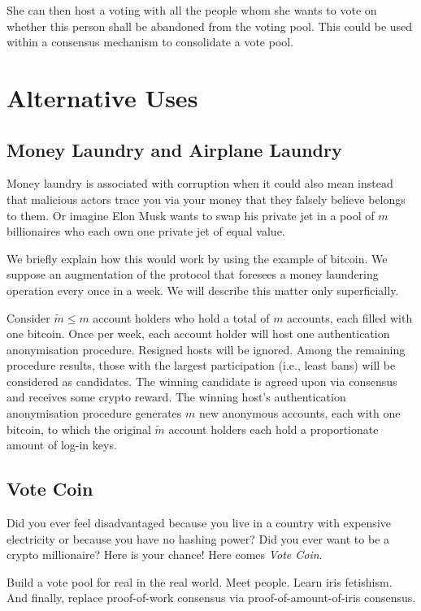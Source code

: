 \documentclass{article}
\theoremstyle{definition}
\begin{document}
	She can then host a voting with all the people whom she wants to vote on whether this person shall be abandoned from the voting pool. This could be used within a consensus mechanism to consolidate a vote pool.
	
	\section{Alternative Uses}
	
	\subsection{Money Laundry and Airplane Laundry}
	Money laundry is associated with corruption when it could also mean instead that malicious actors trace you via your money that they falsely believe belongs to them. Or imagine Elon Musk wants to swap his private jet in a pool of $m$ billionaires who each own one private jet of equal value.
	
	We briefly explain how this would work by using the example of bitcoin. We suppose an augmentation of the protocol that foresees a money laundering operation every once in a week. We will describe this matter only superficially.
	
	Consider $\tilde{m}\leq m$ account holders who hold a total of $m$ accounts, each filled with one bitcoin. Once per week, each account holder will host one authentication anonymisation procedure. Resigned hosts will be ignored. Among the remaining procedure results, those with the largest participation (i.e., least bans) will be considered as candidates. The winning candidate is agreed upon via consensus and receives some crypto reward. The winning host's authentication anonymisation procedure generates $m$ new anonymous accounts, each with one bitcoin, to which the original $\tilde{m}$ account holders each hold a proportionate amount of log-in keys.
	
	\subsection{Vote Coin}
	Did you ever feel disadvantaged because you live in a country with expensive electricity or because you have no hashing power? Did you ever want to be a crypto millionaire? Here is your chance! Here comes \emph{Vote Coin}.
	
	Build a vote pool for real in the real world. Meet people. Learn iris fetishism.
	And finally, replace proof-of-work consensus via proof-of-amount-of-iris consensus.
	
\end{document}
